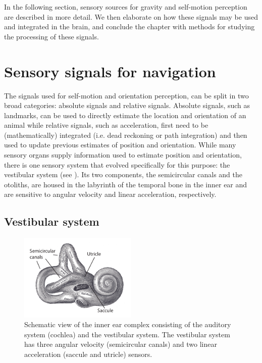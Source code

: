In the following section, sensory sources for gravity and self-motion perception are described in more detail. We then elaborate on how these signals may be used and integrated in the brain, and conclude the chapter with methods for studying the processing of these signals. 
 


\section{Sensory signals for navigation}

The signals used for self-motion and orientation perception, can be split in two broad categories: absolute signals and relative signals. Absolute signals, such as landmarks, can be used to directly estimate the location and orientation of an animal while relative signals, such as acceleration, first need to be (mathematically) integrated (i.e. dead reckoning or path integration) and then used to update previous estimates of position and orientation. While many sensory organs supply information used to estimate position and orientation, there is one sensory system that evolved specifically for this purpose: the vestibular system (see ). Its two components, the semicircular canals and the otoliths, are housed in the labyrinth of the temporal bone in the inner ear and are sensitive to angular velocity and linear acceleration, respectively.


\subsection{Vestibular system}

\begin{figure}
    \includegraphics[width=0.5\textwidth]{src/intro/figures/vestibular.pdf}
    \caption{Schematic view of the inner ear complex consisting of the auditory system (cochlea) and the vestibular system. The vestibular system has three angular velocity (semicircular canals) and two linear acceleration (saccule and utricle) sensors.}
    \label{intro:fig6}
\end{figure}


